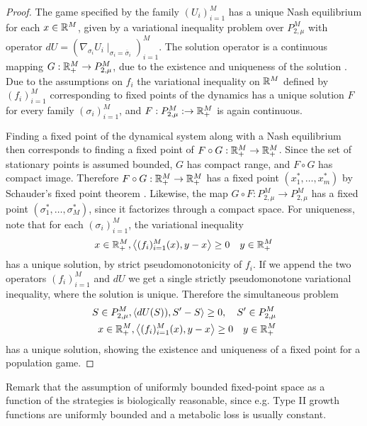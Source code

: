 \begin{proof}
  The game specified by the family $(U_i)_{i=1}^M$ has a unique Nash equilibrium for each $x\in \mathbb{R}^M$, given by a variational inequality problem over $P_{2,\mu}^M$ with operator $dU = (\nabla_{\sigma_i} U_i \mid_{\sigma_i = \overbar{\sigma}_i})_{i=1}^M$. The solution operator is a continuous mapping $G: \mathbb{R}_+^M \to P_{2,\mu}^M$, due to the existence and uniqueness of the solution  \cite[Theorem 4.2]{barbagallo2009continuity}. Due to the assumptions on $f_i$ the variational inequality on $\mathbb{R}^M$ defined by $(f_i)_{i=1}^M$ corresponding to fixed points of the dynamics has a unique solution $F$ for every family $(\sigma_i)_{i=1}^M$, and $F:P_{2,\mu}^M: \to \mathbb{R}^M_+$ is again continuous.

  Finding a fixed point of the dynamical system along with a Nash equilibrium then corresponds to finding a fixed point of $F\circ G: \mathbb{R}_+^M \to \mathbb{R}_+^M$. Since the set of stationary points is assumed bounded, $G$ has compact range, and $F\circ G$ has compact image. Therefore $F\circ G:\mathbb{R}_+^M \to \mathbb{R}_+^M$ has a fixed point $(x_1^*, \dots, x_m^*)$ by Schauder's fixed point theorem \citep[Theorem 3.2, p. 119]{granas2003elementary}. Likewise, the map $G\circ F:P_{2,\mu}^M \to P_{2,\mu}^M$ has a fixed point $(\sigma_1^*,\dots, \sigma_M^*)$, since it factorizes through a compact space.
  For uniqueness, note that for each $(\sigma_i)_{i=1}^M$, the variational inequality
  \begin{equation}
    x \in \mathbb{R}_+^M, \left \langle (f_i)_{i=1}^M(x),y-x \right \rangle\geq 0 \quad y\in \mathbb{R}_+^M
  \end{equation}
  has a unique solution, by strict pseudomonotonicity of $f_i$. If we append the two operators $(f_i)_{i=1}^M$ and $dU$ we get a single strictly pseudomonotone variational inequality, where the solution is unique.
   Therefore the simultaneous problem
  \begin{equation}
    \begin{split}
    S\in P_{2,\mu}^M, \left \langle dU(S)),S'-S \right \rangle \geq 0, \quad S' \in P_{2,\mu}^M \\
    x \in \mathbb{R}_+^M, \left \langle (f_i)_{i=1}^M(x),y-x \right \rangle\geq 0 \quad y\in \mathbb{R}_+^M
  \end{split}
  \end{equation}
    has a unique solution, showing the existence and uniqueness of a fixed point for a population game.
\end{proof}
Remark that the assumption of uniformly bounded fixed-point space as a function of the strategies is biologically reasonable, since e.g. Type II growth functions are uniformly bounded and a metabolic loss is usually constant.


